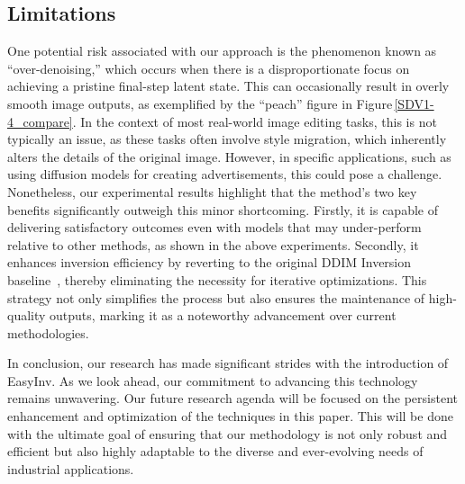 \documentclass[letterpaper]{article} \usepackage{aaai25}  \usepackage{times}  \usepackage{helvet}  \usepackage{courier}  \usepackage[hyphens]{url}  \usepackage{graphicx} \urlstyle{rm} \def\UrlFont{\rm}  \usepackage{natbib}  \usepackage{caption} \frenchspacing  \setlength{\pdfpagewidth}{8.5in} \setlength{\pdfpageheight}{11in} \usepackage{algorithm}
\begin{document}
\subsection{Limitations}
\label{sec:weakness}

One potential risk associated with our approach is the phenomenon known as ``over-denoising,'' which occurs when there is a disproportionate focus on achieving a pristine final-step latent state. This can occasionally result in overly smooth image outputs, as exemplified by the ``peach'' figure in Figure\,\ref{SDV1-4_compare}.
In the context of most real-world image editing tasks, this is not typically an issue, as these tasks often involve style migration, which inherently alters the details of the original image. However, in specific applications, such as using diffusion models for creating advertisements, this could pose a challenge.
Nonetheless, our experimental results highlight that the method's two key benefits significantly outweigh this minor shortcoming. Firstly, it is capable of delivering satisfactory outcomes even with models that may under-perform relative to other methods, as shown in the above experiments. Secondly, it enhances inversion efficiency by reverting to the original DDIM Inversion baseline~\cite{couairon2023diffedit}, thereby eliminating the necessity for iterative optimizations. This strategy not only simplifies the process but also ensures the maintenance of high-quality outputs, marking it as a noteworthy advancement over current methodologies. 


In conclusion, our research has made significant strides with the introduction of EasyInv. As we look ahead, our commitment to advancing this technology remains unwavering. Our future research agenda will be focused on the persistent enhancement and optimization of the techniques in this paper. This will be done with the ultimate goal of ensuring that our methodology is not only robust and efficient but also highly adaptable to the diverse and ever-evolving needs of industrial applications.
\end{document}
